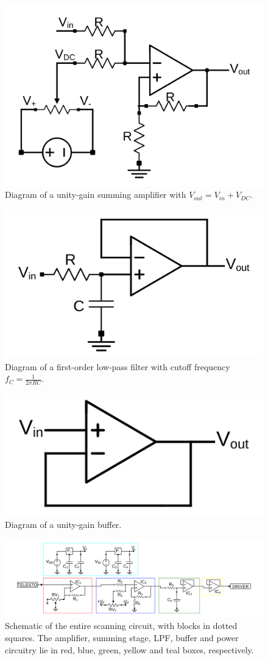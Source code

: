 \documentclass{article}
\begin{document}
\begin{figure}
\centering
\includegraphics[width=.5\textwidth]{Figures/summer.png}
\caption{Diagram of a unity-gain summing amplifier with $V_{out} = V_{in}+V_{DC}$.}
\label{summer}
\end{figure}


\begin{figure}
\centering
\includegraphics[width=.5\textwidth]{Figures/lpf.png}
\caption{Diagram of a first-order low-pass filter with cutoff frequency $f_C = \frac{1}{2\pi RC}$.}
\label{lpf}
\end{figure}


\begin{figure}
\centering
\includegraphics[width=.5\textwidth]{Figures/buffer.png}
\caption{Diagram of a unity-gain buffer.}
\label{buff}
\end{figure}



\begin{figure}
\centering
\includegraphics[width=\textwidth]{Figures/TotalSchem.png}
\caption{Schematic of the entire scanning circuit, with blocks in dotted squares. The amplifier, summing stage, LPF, buffer and power circuitry lie in red, blue, green, yellow and teal boxes, respectively.}
\label{schem}
\end{figure}
\end{document}
